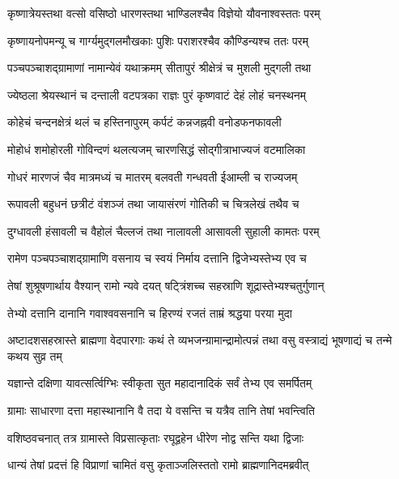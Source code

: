 \twolineshloka
{कृष्णात्रेयस्तथा वत्सो वसिष्ठो धारणस्तथा}
{भाण्डिलश्चैव विज्ञेयो यौवनाश्वस्ततः परम्}%

\twolineshloka
{कृष्णायनोपमन्यू च गार्ग्यमुद्गलमौखकाः}
{पुशिः पराशरश्चैव कौण्डिन्यश्च ततः परम्}%

\twolineshloka
{पञ्चपञ्चाशद्ग्रामाणां नामान्येवं यथाक्रमम्}
{सीतापुरं श्रीक्षेत्रं च मुशली मुद्गली तथा}%

\twolineshloka
{ज्येष्ठला श्रेयस्थानं च दन्ताली वटपत्रका}
{राज्ञः पुरं कृष्णवाटं देहं लोहं चनस्थनम्}%

\twolineshloka
{कोहेचं चन्दनक्षेत्रं थलं च हस्तिनापुरम्}
{कर्पटं कन्नजह्नवी वनोडफनफावली}%

\twolineshloka
{मोहोधं शमोहोरली गोविन्दणं थलत्यजम्}
{चारणसिद्धं सोद्गीत्राभाज्यजं वटमालिका}%

\twolineshloka
{गोधरं मारणजं चैव मात्रमध्यं च मातरम्}
{बलवती गन्धवती ईआम्ली च राज्यजम्}%

\twolineshloka
{रूपावली बहुधनं छत्रीटं वंशञ्जं तथा}
{जायासंरणं गोतिकी च चित्रलेखं तथैव च}%

\twolineshloka
{दुग्धावली हंसावली च वैहोलं चैल्लजं तथा}
{नालावली आसावली सुहाली कामतः परम्}%

\twolineshloka
{रामेण पञ्चपञ्चाशद्ग्रामाणि वसनाय च}
{स्वयं निर्माय दत्तानि द्विजेभ्यस्तेभ्य एव च}%

\twolineshloka
{तेषां शुश्रूषणार्थाय वैश्यान् रामो न्यवे दयत्}
{षट्त्रिंशच्च सहस्राणि शूद्रास्तेभ्यश्चतुर्गुणान्}%

\twolineshloka
{तेभ्यो दत्तानि दानानि गवाश्ववसनानि च}
{हिरण्यं रजतं ताम्रं श्रद्धया परया मुदा}%


\threelineshloka
{अष्टादशसहस्रास्ते ब्राह्मणा वेदपारगाः}
{कथं ते व्यभजन्ग्रामान्द्रामोत्पन्नं तथा वसु}
{वस्त्राद्यं भूषणाद्यं च तन्मे कथय सुव्र तम्}%


\twolineshloka
{यज्ञान्ते दक्षिणा यावत्सर्त्विग्भिः स्वीकृता सुत}
{महादानादिकं सर्वं तेभ्य एव समर्पितम्}%

\twolineshloka
{ग्रामाः साधारणा दत्ता महास्थानानि वै तदा}
{ये वसन्ति च यत्रैव तानि तेषां भवन्त्विति}%

\twolineshloka
{वशिष्ठवचनात् तत्र ग्रामास्ते विप्रसात्कृताः}
{रघूद्वहेन धीरेण नोद्व सन्ति यथा द्विजाः}%

\twolineshloka
{धान्यं तेषां प्रदत्तं हि विप्राणां चामितं वसु}
{कृताञ्जलिस्ततो रामो ब्राह्मणानिदमब्रवीत्}%

